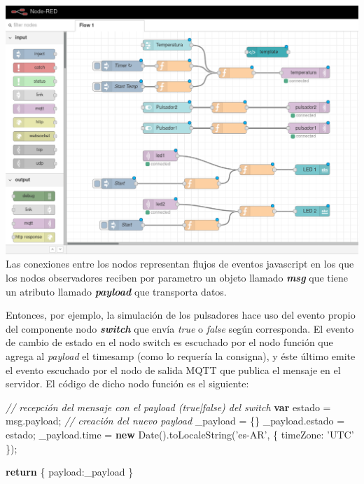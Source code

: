 \documentclass[11pt]{extarticle}
\newenvironment{Shaded}{}{}
\newcommand{\KeywordTok}[1]{\textcolor[rgb]{0.00,0.44,0.13}{\textbf{{#1}}}}
\newcommand{\DataTypeTok}[1]{\textcolor[rgb]{0.56,0.13,0.00}{{#1}}}
\newcommand{\StringTok}[1]{\textcolor[rgb]{0.25,0.44,0.63}{{#1}}}
\newcommand{\CommentTok}[1]{\textcolor[rgb]{0.38,0.63,0.69}{\textit{{#1}}}}
\newcommand{\NormalTok}[1]{{#1}}
\newcommand{\VariableTok}[1]{\textcolor[rgb]{0.10,0.09,0.49}{{#1}}}
\newcommand{\ControlFlowTok}[1]{\textcolor[rgb]{0.00,0.44,0.13}{\textbf{{#1}}}}
\newcommand{\OperatorTok}[1]{\textcolor[rgb]{0.40,0.40,0.40}{{#1}}}
\newcommand{\AttributeTok}[1]{\textcolor[rgb]{0.49,0.56,0.16}{{#1}}}
\begin{document}
    \includegraphics{images/node-red-sim-ardu.png}\\

    Las conexiones entre los nodos representan flujos de eventos javascript
en los que los nodos observadores reciben por parametro un objeto
llamado \textbf{\emph{msg}} que tiene un atributo llamado
\textbf{\emph{payload}} que transporta datos.

Entonces, por ejemplo, la simulación de los pulsadores hace uso del
evento propio del componente nodo \textbf{\emph{switch}} que envía
\emph{true} o \emph{false} según corresponda. El evento de cambio de
estado en el nodo switch es escuchado por el nodo función que agrega al
\emph{payload} el timesamp (como lo requería la consigna), y éste último
emite el evento escuchado por el nodo de salida MQTT que publica el
mensaje en el servidor. El código de dicho nodo función es el siguiente:

\begin{Shaded}
\begin{Highlighting}[]
\CommentTok{// recepción del mensaje con el payload (true|false) del switch}
\KeywordTok{var}\NormalTok{ estado }\OperatorTok{=} \VariableTok{msg}\NormalTok{.}\AttributeTok{payload}\OperatorTok{;}
\CommentTok{// creación del nuevo payload}
\NormalTok{_payload }\OperatorTok{=} \OperatorTok{\{\}}
\VariableTok{_payload}\NormalTok{.}\AttributeTok{estado} \OperatorTok{=}\NormalTok{ estado}\OperatorTok{;}
\VariableTok{_payload}\NormalTok{.}\AttributeTok{time} \OperatorTok{=} \KeywordTok{new} \AttributeTok{Date}\NormalTok{().}\AttributeTok{toLocaleString}\NormalTok{(}\StringTok{'es-AR'}\OperatorTok{,} \OperatorTok{\{} \DataTypeTok{timeZone}\OperatorTok{:} \StringTok{'UTC'} \OperatorTok{\}}\NormalTok{)}\OperatorTok{;}

\ControlFlowTok{return} \OperatorTok{\{}
    \DataTypeTok{payload}\OperatorTok{:}\NormalTok{_payload   }
\OperatorTok{\}}
\end{Highlighting}
\end{Shaded}
\end{document}
